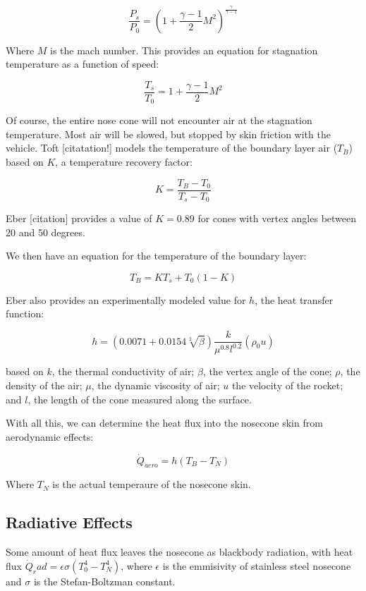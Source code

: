 \documentclass[twocolumn]{article}
\begin{document}
            \[\frac{P_s}{P_0} =\left(1+\frac{\gamma-1}{2}M^2\right)^{\frac{\gamma}{\gamma-1}}\]

            Where $M$ is the mach number. This provides an equation for
            stagnation temperature as a function of speed:

            \[\frac{T_s}{T_0}=1+\frac{\gamma-1}{2}M^2\]

            Of course, the entire nose cone will not encounter air at the
            stagnation temperature. Most air will be slowed, but stopped by skin 
            friction with the vehicle. Toft [citatation!]
            models the temperature of the boundary layer air ($T_B$) based on
            $K$, a temperature recovery factor:

            \[K=\frac{T_B-T_0}{T_s-T_0}\]

            Eber [citation] provides a value of $K=0.89$ for cones with vertex
            angles between 20 and 50 degrees.

            We then have an equation for the temperature of the boundary layer:

            \[T_B=KT_s+T_0\left(1-K\right)\]

            Eber also provides an experimentally modeled value for $h$, the heat
            transfer function:
            
            \[h=\left(0.0071+0.0154 \sqrt[2]{\beta}\right)\frac{k}{\mu^{0.8}l^{0.2}}\left(\rho_0 u\right)\]

            based on $k$, the thermal conductivity of air; $\beta$, the vertex 
            angle of the cone; $\rho$, the density of the air; $\mu$, the dynamic
            viscosity of air; $u$ the velocity of the rocket; and $l$, the 
            length of the cone measured along the surface. 

            With all this, we can determine the heat flux into the nosecone skin
            from aerodynamic effects:

            \begin{equation}
                \dot{Q}_{aero}= h(T_B-T_N)
            \end{equation}

            Where $T_N$ is the actual temperaure of the nosecone skin.

        \subsection{Radiative Effects}
            Some amount of heat flux leaves the nosecone as blackbody radiation,
            with heat flux $\dot{Q}_rad=\epsilon\sigma(T_0^4-T_N^4)$, where
            $\epsilon$ is the emmisivity of stainless steel nosecone and 
            $\sigma$ is the Stefan-Boltzman constant.
\end{document}
